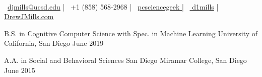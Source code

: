 \documentclass[]{awesome-cv}
\begin{document}
\begin{center}
	  \\
	\vspace{2mm}
	{\faEnvelopeO\ \href{mailto:djmills@ucsd.edu}{djmills@ucsd.edu}} | {\faMobile\ +1 (858) 568-2968} | {\faGithub\ \href{https://github.com/pcsciencegeek}{pcsciencegeek }}|  {\faLinkedinSquare\ \href{https://linkedin.com/in/d1mills/}{ d1mills}} | {\faInternetExplorer \href{http://drewmills.co.uk/}{ DrewJMills.com}}
\end{center}
\begin{cventries}
	\cventry
	{B.S. in Cognitive Computer Science with Spec. in Machine Learning}
	{University of California, San Diego} 
	{}
	{June 2019}
	{}
\end{cventries}

\vspace{-5mm}

\begin{cventries}
	\cventry
	{A.A. in Social and Behavioral Sciences}
	{San Diego Miramar College, San Diego} 
	{}
	{June 2015}
	{}
\end{cventries}
\vspace{-5mm}
\end{document}
